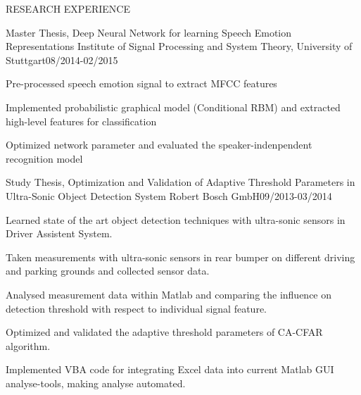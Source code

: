 \documentclass{resume} %
\begin{document}
\begin{rSection}{RESEARCH  EXPERIENCE}

\begin{rSubsection}{Master Thesis,  Deep Neural Network for learning Speech Emotion Representations
}{}{Institute of Signal Processing and System Theory, University of Stuttgart}{08/2014-02/2015}

\item Pre-processed speech emotion signal to extract MFCC features
\item Implemented probabilistic graphical model (Conditional RBM) and extracted high-level features for classification
\item Optimized network parameter and evaluated the speaker-indenpendent recognition model

\end{rSubsection}


\begin{rSubsection}{Study Thesis, Optimization and Validation of Adaptive Threshold Parameters in Ultra-Sonic Object Detection System 
}{}{Robert Bosch GmbH}{09/2013-03/2014}

\item Learned state of the art object detection techniques with ultra-sonic sensors in Driver Assistent System.
\item Taken measurements with ultra-sonic sensors in rear bumper on different driving and parking grounds and collected sensor data.
\item Analysed measurement data within Matlab and comparing the influence on detection threshold with respect to individual signal feature.
\item Optimized and validated the adaptive threshold parameters of CA-CFAR algorithm.
\item Implemented VBA code for integrating Excel data into current Matlab GUI analyse-tools, making analyse automated. 


\end{rSubsection}
\end{rSection}
\end{document}
